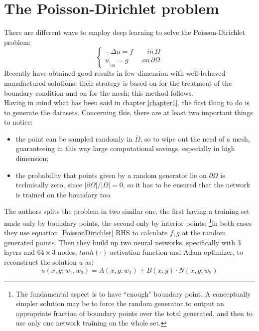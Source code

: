 \documentclass[12pt, a4paper]{report}
\theoremstyle{definition}
\begin{document}
{\section{The Poisson-Dirichlet problem}\label{section2.1}
There are different ways to employ deep learning to solve the Poisson-Dirichlet problem:
\begin{equation}\label{PoissonDirichlet}
\begin{cases}
-\Delta u = f \quad\quad in\, \Omega\\
u_{|_{\partial\Omega}}=g\qquad on\, \partial\Omega 
\end{cases}
\end{equation}
Recently \cite{Kailai} have obtained good results in few dimension with well-behaved manufactured solutions; their strategy is based on \cite{Lagaris} for the treatment of the boundary condition and on \cite{Sirignano} for the mesh; this method follows.\\
Having in mind what has been said in chapter \ref{chapter1}, the first thing to do is to generate the datasets. Concerning this, there are at least two important things to notice: 
\begin{itemize}
	\item the point can be sampled randomly in $\overline{\Omega}$, so to wipe out the need of a mesh, guaranteeing in this way large computational savings, especially in high dimension;
	\item the probability that points given by a random generator lie on $\partial \Omega$ is technically zero, since $|\partial\Omega|/|\Omega|=0$, so it has to be ensured that the network is trained on the boundary too.
\end{itemize}
\noindent The authors splits the problem in two similar one, the first having a training set made only by boundary points, the second only by interior points; \footnote{The fundamental aspect is to have ``enough" boundary point. A conceptually simpler solution may be to force the random generator to output an appropriate fraction of boundary points over the total generated, and then to use only one network training on the whole set.}in both cases they use equation \eqref{PoissonDirichlet} RHS to calculate $f,g$ at the random generated points. Then they build up two neural networks, specifically with $3$ layers and $64\times 3$ nodes, $tanh(\cdot)$ activation function and Adam optimizer, to reconstruct the solution $u$ as:
\begin{equation}\label{sol_kailai}
u(x,y;w_1,w_2)=A(x,y;w_1)+B(x,y)\cdot N(x,y;w_2)

\end{equation}}
\end{document}
